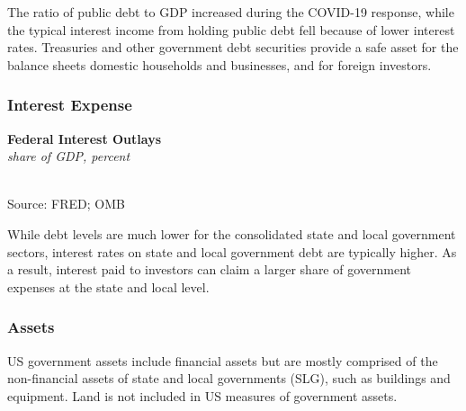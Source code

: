 \documentclass{report}
\makeatletter
\newcommand{\tbllink}[1]{\href{https://raw.githubusercontent.com/bdecon/US-chartbook/master/chartbook/data/#1}{\faTable}}
\newcommand*\short[1]{\expandafter\@gobbletwo\number\numexpr#1\relax}
\newcommand{\shdateaxisticks}{
		date coordinates in=x, axis line style={draw=none},
		xmax={2022-01-30},
		max space between ticks=40,	    
		xtick={{1990-01-01}, {1995-01-01}, {2000-01-01}, 
			{2005-01-01}, {2010-01-01}, {2015-01-01}, {2020-01-01}},
		minor xtick={},
		enlarge y limits={0.06}, enlarge x limits={0.01},
		}
\newcommand{\thickline}[4]{\addplot[ultra thick, no markers, color=#1] 
		table [x=#2, y=#3, col sep=comma] {#4};	}
\newcommand{\rbars}{
		\fill[color=black!10] (axis cs:{1990-07-01},\pgfkeysvalueof{/pgfplots/ymin}) rectangle 
			(axis cs:{1991-03-01}, \pgfkeysvalueof{/pgfplots/ymax});
		\fill[color=black!10] (axis cs:{2007-12-01},\pgfkeysvalueof{/pgfplots/ymin}) rectangle 
			(axis cs:{2009-07-01}, \pgfkeysvalueof{/pgfplots/ymax});
		\fill[color=black!10] (axis cs:{2001-03-01},\pgfkeysvalueof{/pgfplots/ymin}) rectangle 
			(axis cs:{2001-11-01}, \pgfkeysvalueof{/pgfplots/ymax});
		\fill[color=black!10] (axis cs:{2020-02-01},\pgfkeysvalueof{/pgfplots/ymin}) rectangle 
			(axis cs:{2020-05-01}, \pgfkeysvalueof{/pgfplots/ymax});}
\makeatother
\begin{document}
{\begin{minipage}{0.76\textwidth}
\small The ratio of public debt to GDP increased during the COVID-19 response, while the typical interest income from holding public debt fell because of lower interest rates. Treasuries and other government debt securities provide a safe asset for the balance sheets domestic households and businesses, and for foreign investors.
\end{minipage}
\subsubsection*{\color{black!70} \seriffont Interest Expense}
\begin{minipage}{0.33\textwidth}
\small 
\end{minipage} \hspace{6mm} \begin{minipage}{0.38\textwidth}
\normalsize \textbf{Federal Interest Outlays}\\
\footnotesize{\textit{share of GDP, percent}}\\
\hspace*{-2mm} \\
\footnotesize{Source: FRED; OMB} \hfill \tbllink{fedintexp.csv}
\end{minipage} 
\vspace{1mm}

\begin{minipage}{0.76\textwidth}
\small While debt levels are much lower for the consolidated state and local government sectors, interest rates on state and local government debt are typically higher. As a result, interest paid to investors can claim a larger share of government expenses at the state and local level.
\end{minipage}
\newpage
\begin{minipage}{0.76\textwidth}
\subsubsection*{\color{black!70} \seriffont Assets}
\small US government assets include financial assets but are mostly comprised of the non-financial assets of state and local governments (SLG), such as buildings and equipment. Land is not included in US measures of government assets. 


\end{minipage}}
\end{document}
